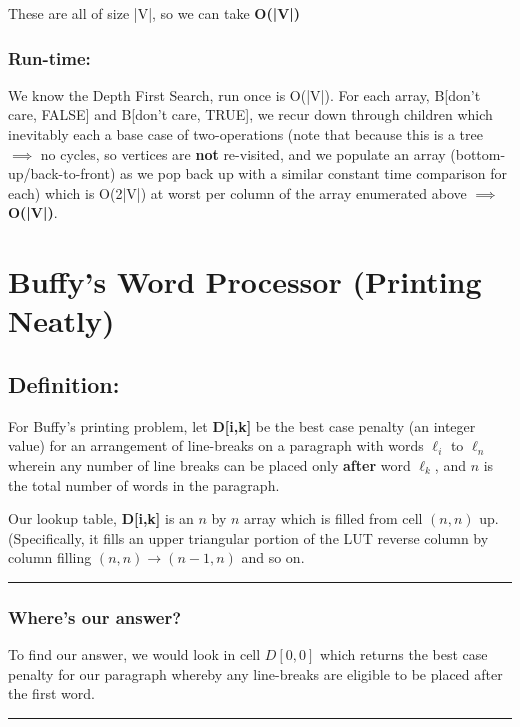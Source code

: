 \documentclass[conference]{styles/acmsiggraph}
\newcommand{\?}{\stackrel{?}{=}}
\begin{document}
These are all of size |V|, so we can take \textbf{O(|V|)}

\subsubsection*{Run-time:}

We know the Depth First Search, run once is O(|V|).  For each array, B[don't care, FALSE] and B[don't care, TRUE], we recur down through children which inevitably each a base case of two-operations (note that because this is a tree $\implies$ no cycles, so vertices are \textbf{not} re-visited, and we populate an array (bottom-up/back-to-front) as we pop back up with a similar constant time comparison for each) which is O(2|V|) at worst per column of the array enumerated above $\implies$ \textbf{O(|V|)}.






\newpage

\section{Buffy's Word Processor (Printing Neatly)}
\subsection{Definition:} \label{D-arrayDef}
For Buffy's printing problem, let \textbf{D[i,k]} be the best case penalty (an integer value) for an arrangement of line-breaks on a paragraph with words $\ell_i$ to $\ell_n$ wherein any number of line breaks can be placed only \textbf{after} word $\ell_k$, and $n$ is the total number of words in the paragraph.

Our lookup table, \textbf{D[i,k]} is an $n$ by $n$ array which is filled from cell $(n,n)$ up. (Specifically, it fills an upper triangular portion of the LUT reverse column by column filling $(n,n) \rightarrow (n-1, n)$ and so on.

\rule{\textwidth}{0.4pt}
\subsubsection*{Where's our answer?}
To find our answer, we would look in cell $D[0,0]$ which returns the best case penalty for our paragraph whereby any line-breaks are eligible to be placed after the first word. \\
\rule{\textwidth}{0.4pt}
\end{document}
